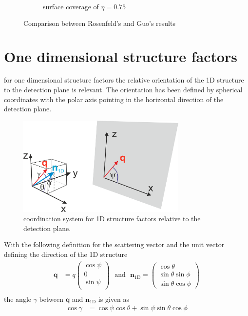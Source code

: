 \begin{figure}[htb]
\begin{subfigure}[b]{.47\textwidth}
   \caption{surface coverage of $\eta=0.75$}
   \label{fig:RosenfeldGuo2}
\end{subfigure}
  \caption{Comparison between Rosenfeld's and Guo's results}
  \label{fig:RosenfeldGuo}
\end{figure}

\clearpage
\section{One dimensional structure factors}

for one dimensional structure factors the relative orientation of the 1D structure to the detection plane is relevant. The orientation has been defined by spherical coordinates with the polar axis pointing in the horizontal direction of the detection plane.
\begin{figure}[htb]
\begin{center}
\includegraphics[width=0.75\textwidth]{../images/structure_factor/SQ_1D_2D/coord_SQ_1D.png}
\end{center}
\caption{coordination system for 1D structure factors relative to the detection plane.}
\label{fig:coord1DSQ}
\end{figure}
With the following definition for the scattering vector and the unit vector defining the direction of the 1D structure
\begin{align}
  \mathbf{q} &=q  \begin{pmatrix}
               \cos \psi \\
               0 \\
               \sin \psi \\
             \end{pmatrix}
   \mbox{~~and~~}
  \mathbf{n}_\mathrm{1D} =
    \begin{pmatrix}
        \cos \theta \\
        \sin \theta \sin \phi  \\
        \sin \theta \cos \phi
    \end{pmatrix} \\
\end{align}
the angle $\gamma$ between $\mathbf{q}$ and $ \mathbf{n}_\mathrm{1D}$ is given as
\begin{align}
  \cos\gamma &= \cos\psi\cos\theta+\sin\psi\sin\theta\cos\phi
\end{align}

